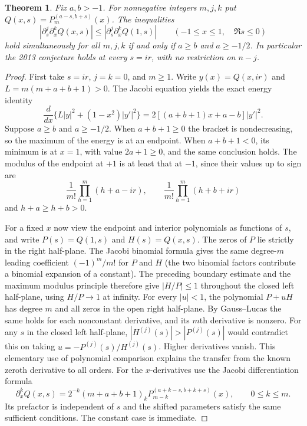 \documentclass[11pt,a4paper]{article}
\newtheorem{theorem}{Theorem}[section]
\numberwithin{equation}{section}
\begin{document}
\begin{theorem}\label{th:jacobi}
Fix $a,b>-1$. For nonnegative integers $m,j,k$ put
$Q(x,s)=P_m^{(a-s,b+s)}(x)$. The inequalities
\[
 |\partial_s^j\partial_x^kQ(x,s)|
       \le |\partial_s^j\partial_x^kQ(1,s)|
 \qquad(-1\le x\le1,\quad \Re s\le0)
\]
hold simultaneously for all $m,j,k$ if and only if
$a\ge b$ and $a\ge-1/2$. In particular the 2013 conjecture holds
at every $s=ir$, with no restriction on $n-j$.
\end{theorem}
\begin{proof}
First take $s=ir$, $j=k=0$, and $m\ge1$.
Write $y(x)=Q(x,ir)$ and $L=m(m+a+b+1)>0$.
The Jacobi equation yields the exact energy identity
\[
 \frac{d}{dx}\{L|y|^2+(1-x^2)|y'|^2\}
       =2[(a+b+1)x+a-b]|y'|^2.
\]
Suppose $a\ge b$ and $a\ge-1/2$. When $a+b+1\ge0$ the bracket
is nondecreasing, so the maximum of the energy is at an endpoint.
When $a+b+1<0$, its minimum is at $x=1$, with value $2a+1\ge0$,
and the same conclusion holds. The modulus of the endpoint at $+1$
is at least that at $-1$, since their values up to sign are
\[
 \frac1{m!}\prod_{h=1}^m(h+a-ir),\qquad
 \frac1{m!}\prod_{h=1}^m(h+b+ir)
\]
and $h+a\ge h+b>0$.

For a fixed $x$ now view the endpoint and interior polynomials as
functions of $s$, and write $P(s)=Q(1,s)$ and $H(s)=Q(x,s)$.
The zeros of $P$ lie strictly in the right half-plane.
The Jacobi binomial formula gives the same degree-$m$ leading
coefficient $(-1)^m/m!$ for $P$ and $H$ (the two binomial factors
contribute a binomial expansion of a constant).
The preceding boundary estimate and the maximum modulus principle
therefore give $|H/P|\le1$ throughout the closed left half-plane,
using $H/P\to1$ at infinity. For every $|u|<1$, the polynomial
$P+uH$ has degree $m$ and all zeros in the open right half-plane.
By Gauss--Lucas the same holds for each nonconstant derivative,
and its $m$th derivative is nonzero. For any $s$ in the closed left
half-plane, $|H^{(j)}(s)|>|P^{(j)}(s)|$ would contradict this on
taking $u=-P^{(j)}(s)/H^{(j)}(s)$. Higher derivatives vanish.
This elementary use of polynomial comparison explains the transfer
from the known zeroth derivative to all orders. For the $x$-derivatives
use the Jacobi differentiation formula
\[
 \partial_x^kQ(x,s)=2^{-k}(m+a+b+1)_k
       P_{m-k}^{(a+k-s,b+k+s)}(x),\qquad 0\le k\le m.
\]
Its prefactor is independent of $s$ and the shifted parameters
satisfy the same sufficient conditions. The constant case is immediate.


\end{proof}
\end{document}
